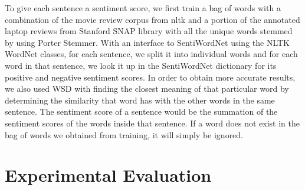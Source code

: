 \documentclass{article}
\begin{document}
To give each sentence a sentiment score, we first train a bag of words with a combination of the movie review corpus from nltk and a portion of the annotated laptop reviews from Stanford SNAP library with all the unique words stemmed by using Porter Stemmer. With an interface to SentiWordNet using the NLTK WordNet classes, for each sentence, we split it into individual words and for each word in that sentence, we look it up in the SentiWordNet dictionary for its positive and negative sentiment scores. In order to obtain more accurate results, we also used WSD with finding the closest meaning of that particular word by determining the similarity that word has with the other words in the same sentence.  The sentiment score of a sentence would be the summation of the sentiment scores of the words inside that sentence. If a word does not exist in the bag of words we obtained from training, it will simply be ignored.


\section{Experimental Evaluation} 
\end{document}
